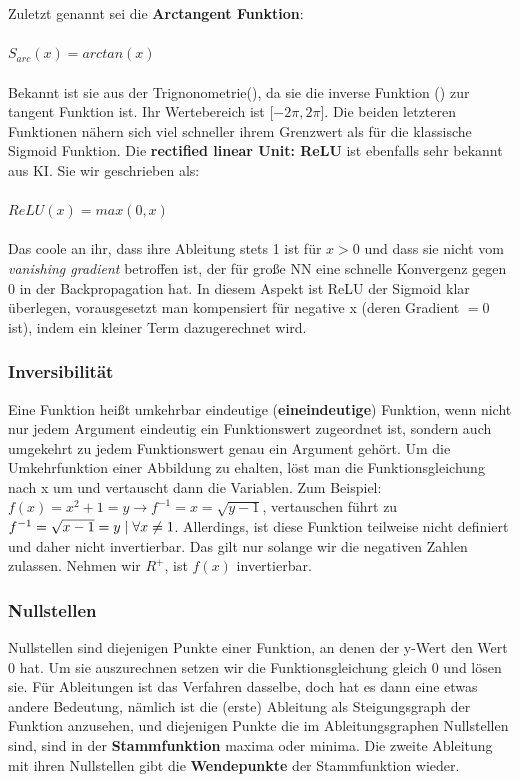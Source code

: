 \documentclass[letterpaper, titlepage]{article}
\begin{document}
\\ \\ 
Zuletzt genannt sei die \textbf{Arctangent Funktion}:
\\ \\
$S_{arc}(x)=arctan(x)$
\\ \\ 
Bekannt ist sie aus der Trignonometrie(), da sie die inverse Funktion () zur tangent Funktion ist. Ihr Wertebereich ist [$-2 \pi, 2 \pi$]. Die beiden letzteren Funktionen nähern sich viel schneller ihrem Grenzwert als für die klassische Sigmoid Funktion. Die \textbf{rectified linear Unit: ReLU} ist ebenfalls sehr bekannt aus KI. Sie wir geschrieben als: 
\\ \\
$ReLU(x)=max(0,x)$
\\ \\
Das coole an ihr, dass ihre Ableitung stets 1 ist für $x>0$ und dass sie nicht vom \textit{vanishing gradient} betroffen ist, der für große NN eine schnelle Konvergenz gegen 0 in der Backpropagation hat. In diesem Aspekt ist ReLU der Sigmoid klar überlegen, vorausgesetzt man kompensiert für negative x (deren Gradient $= 0$ ist), indem ein kleiner Term dazugerechnet wird.

\subsubsection{Inversibilität}\label{Inversibilität}
Eine Funktion heißt umkehrbar eindeutige (\textbf{eineindeutige}) Funktion, wenn nicht nur jedem Argument eindeutig ein Funktionswert zugeordnet ist, sondern auch umgekehrt zu jedem Funktionswert genau ein Argument gehört. Um die Umkehrfunktion einer Abbildung zu ehalten, löst man die Funktionsgleichung nach x um und vertauscht dann die Variablen. Zum Beispiel: $f(x)=x^2+1=y \rightarrow f^{-1}=x=\sqrt{y-1}$, vertauschen führt zu $f^{-1}=\sqrt{x-1}=y \hspace{0.1cm} | \hspace{0.1cm} \forall x \neq 1$. Allerdings, ist diese Funktion teilweise nicht definiert und daher nicht invertierbar. Das gilt nur solange wir die negativen Zahlen zulassen. Nehmen wir $\textit{R}^+$, ist $f(x)$ invertierbar.

\subsubsection{Nullstellen}
Nullstellen sind diejenigen Punkte einer Funktion, an denen der y-Wert den Wert 0 hat. Um sie auszurechnen setzen wir die Funktionsgleichung gleich 0 und lösen sie. Für Ableitungen ist das Verfahren dasselbe, doch hat es dann eine etwas andere Bedeutung, nämlich ist die (erste) Ableitung als Steigungsgraph der Funktion anzusehen, und diejenigen Punkte die im Ableitungsgraphen Nullstellen sind, sind in der \textbf{Stammfunktion} maxima oder minima. Die zweite Ableitung mit ihren Nullstellen gibt die \textbf{Wendepunkte} der Stammfunktion wieder. 
\end{document}
